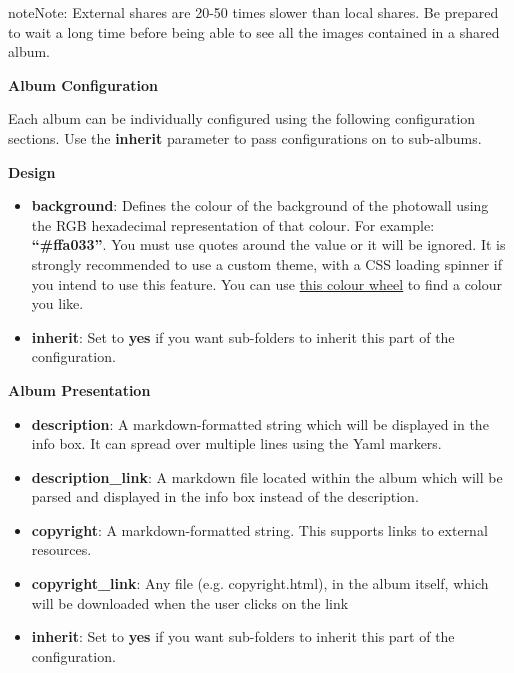\documentclass[letterpaper,10pt,english]{sphinxmanual}
\begin{document}
\begin{notice}{note}{Note:}
External shares are 20-50 times slower than local shares. Be prepared
to wait a long time before being able to see all the images contained in a
shared album.
\end{notice}

\textbf{Album Configuration}

Each album can be individually configured using the following configuration
sections. Use the \textbf{inherit} parameter to pass configurations on to
sub-albums.

\textbf{Design}
\begin{itemize}
\item {} 
\textbf{background}: Defines the colour of the background of the photowall
using the RGB hexadecimal representation of that colour. For example:
\textbf{``\#ffa033''}. You must use quotes around the value or it will
be ignored. It is strongly recommended to use a custom theme, with a CSS
loading spinner if you intend to use this feature. You can use \href{http://paletton.com/}{this colour
wheel} to find a colour you like.

\item {} 
\textbf{inherit}: Set to \textbf{yes} if you want sub-folders to inherit this part of
the configuration.

\end{itemize}

\textbf{Album Presentation}
\begin{itemize}
\item {} 
\textbf{description}: A markdown-formatted string which will be displayed in the
info box. It can spread over multiple lines using the Yaml markers.

\item {} 
\textbf{description\_link}: A markdown file located within the album which will
be parsed and displayed in the info box instead of the description.

\item {} 
\textbf{copyright}: A markdown-formatted string. This supports links to external
resources.

\item {} 
\textbf{copyright\_link}: Any file (e.g. copyright.html), in the album itself,
which will be downloaded when the user clicks on the link

\item {} 
\textbf{inherit}: Set to \textbf{yes} if you want sub-folders to inherit this part of
the configuration.

\end{itemize}
\end{document}
